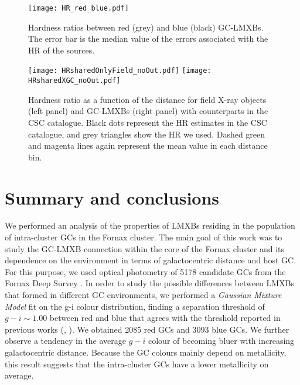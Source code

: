 \documentclass{aa}
\begin{document}
\begin{figure}[]
   
    \texttt{[image: HR\_red\_blue.pdf]}
    \caption{Hardness ratios between red (grey) and blue (black) GC-LMXBs. The error bar is the median value of the errors associated with the HR of the sources.} 
    \label{fig:HRrb}
\end{figure}

\begin{figure*}[]
    \centering
    
    \texttt{[image: HRsharedOnlyField\_noOut.pdf]}%
    \texttt{[image: HRsharedXGC\_noOut.pdf]}
    \caption{ Hardness ratio as a function of the distance for field X-ray objects (left panel) and GC-LMXBs (right panel) with counterparts in the CSC catalogue. Black dots represent the HR estimates in the CSC catalogue, and grey triangles show the HR we used. Dashed green and magenta lines again represent the mean value in each distance bin. }
    \label{fig:HRCSC333}
\end{figure*}





\section{Summary and conclusions}

We performed an analysis of the properties of LMXBs residing in the population of intra-cluster GCs in the Fornax cluster. The main goal of this work was to study the GC-LMXB connection within the core of the Fornax cluster and its dependence on the environment in terms of galactocentric distance and host GC. For this purpose, we used optical photometry of 5178 candidate GCs from the Fornax Deep Survey \citep{Cantiello2020}. In order to study the possible differences between LMXBs that formed in different GC environments, we performed a \textit{Gaussian Mixture Model} fit on the g-i colour distribution, finding a separation threshold of $g-i \sim 1.00$ between red and blue that agrees with the threshold reported in previous works (\citealt{D'Abrusco2016}, \citealt{Cantiello2020}). We obtained 2085 red GCs and 3093 blue GCs. 
We further observe a tendency in the average $g-i$ colour of becoming bluer with increasing galactocentric distance. Because the GC colours mainly depend on metallicity, this result suggests that the intra-cluster GCs have a lower metallicity on average. 
\end{document}

